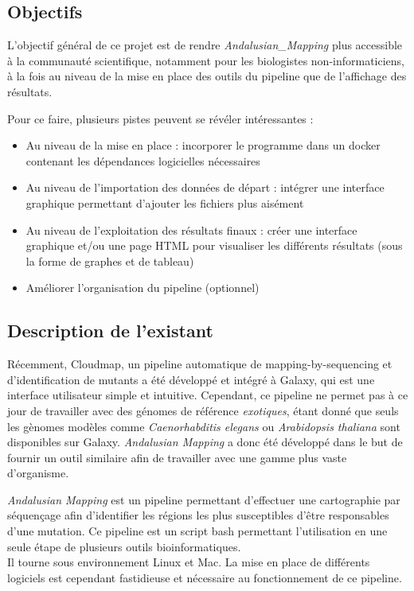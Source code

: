 \documentclass[12pt]{article}
\begin{document}
\subsection{Objectifs}

L'objectif général de ce projet est de rendre \textit{Andalusian\_Mapping} plus accessible à la communauté scientifique, notamment pour les biologistes non-informaticiens, à la fois au niveau de la mise en place des outils du pipeline que de l'affichage des résultats.

Pour ce faire, plusieurs pistes peuvent se révéler intéressantes : 

\begin{itemize}
\item Au niveau de la mise en place : incorporer le programme dans un docker contenant les dépendances logicielles nécessaires
\item Au niveau de l'importation des données de départ : intégrer une interface graphique permettant d'ajouter les fichiers plus aisément
\item Au niveau de l'exploitation des résultats finaux : créer une interface graphique et/ou une page HTML pour visualiser les différents résultats (sous la forme de graphes et de tableau)
\item Améliorer l'organisation du pipeline (optionnel) 
\end{itemize}

\subsection{Description de l'existant}

Récemment, Cloudmap, un pipeline automatique de mapping-by-sequencing et d'identification de mutants a été développé et intégré à Galaxy, qui est une interface utilisateur simple et intuitive.
Cependant, ce pipeline ne permet pas à ce jour de travailler avec des génomes de référence \textit{exotiques}, étant donné que seuls les gènomes modèles comme \textit{Caenorhabditis elegans} ou \textit{Arabidopsis thaliana} sont disponibles sur Galaxy.
\textit{Andalusian Mapping} a donc été développé dans le but de fournir un outil similaire afin de travailler avec une gamme plus vaste d'organisme.

\textit{Andalusian Mapping} est un pipeline permettant d'effectuer une cartographie par séquençage afin d'identifier les régions les plus susceptibles d'être responsables d'une mutation.
Ce pipeline est un script bash permettant l'utilisation en une seule étape de plusieurs outils bioinformatiques. \\
Il tourne sous environnement Linux et Mac. La mise en place de différents logiciels est cependant fastidieuse et nécessaire au fonctionnement de ce pipeline.
\end{document}
